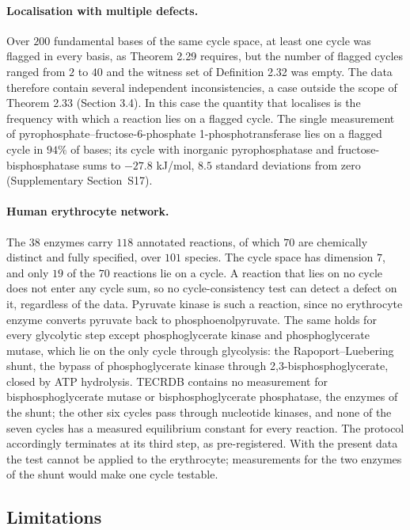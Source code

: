 \documentclass[11pt,a4paper]{article}
\theoremstyle{pstyle}
\theoremstyle{definition}
\theoremstyle{remark}
\begin{document}
\paragraph{Localisation with multiple defects.} Over $200$ fundamental
bases of the same cycle space, at least one cycle was flagged in every
basis, as Theorem 2.29 requires, but the number of flagged
cycles ranged from $2$ to $40$ and the witness set of
Definition 2.32 was empty. The data therefore contain several
independent inconsistencies, a case outside the scope of
Theorem 2.33 (Section 3.4). In this case the
quantity that localises is the frequency with which a reaction lies on
a flagged cycle. The single measurement of
pyrophosphate--fructose-6-phosphate 1-phosphotransferase lies on a
flagged cycle in $94\%$ of bases; its cycle with inorganic
pyrophosphatase and fructose-bisphosphatase sums to $-27.8$ kJ/mol,
$8.5$ standard deviations from zero (Supplementary Section~S17).

\paragraph{Human erythrocyte network.} The $38$ enzymes carry $118$
annotated reactions, of which $70$ are chemically distinct and fully
specified, over $101$ species. The cycle space has dimension $7$, and
only $19$ of the $70$ reactions lie on a cycle. A reaction that lies on
no cycle does not enter any cycle sum, so no cycle-consistency test can
detect a defect on it, regardless of the data. Pyruvate kinase is such
a reaction, since no erythrocyte enzyme converts pyruvate back to
phosphoenolpyruvate. The same holds for every glycolytic step except
phosphoglycerate kinase and phosphoglycerate mutase, which lie on the
only cycle through glycolysis: the Rapoport--Luebering shunt, the bypass
of phosphoglycerate kinase through 2,3-bisphosphoglycerate, closed by
ATP hydrolysis. TECRDB contains no measurement for bisphosphoglycerate
mutase or bisphosphoglycerate phosphatase, the enzymes of the shunt; the
other six cycles pass through nucleotide kinases, and none of the seven
cycles has a measured equilibrium constant for every reaction. The
protocol accordingly terminates at its third step, as pre-registered.
With the present data the test cannot be applied to the erythrocyte;
measurements for the two enzymes of the shunt would make one cycle
testable.

\subsection{Limitations}
\label{sec:limits}
\end{document}
